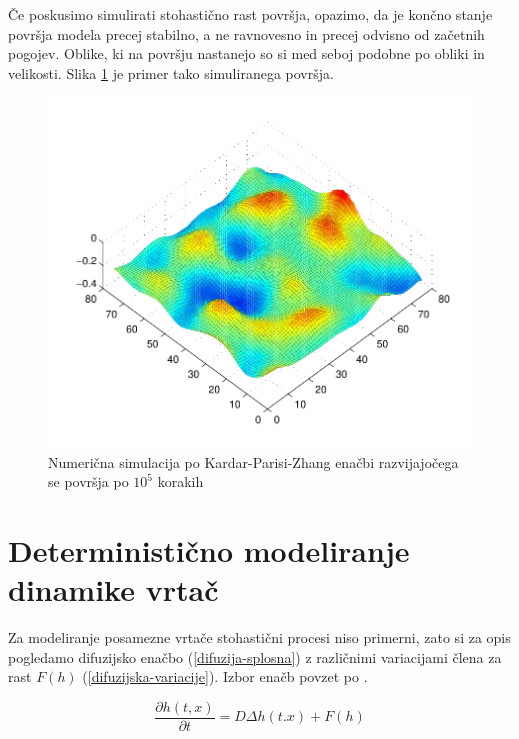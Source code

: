 \documentclass[a4paper, oneside, 12pt]{book}
\begin{document}
            Če poskusimo simulirati stohastično rast površja, opazimo, da je končno stanje površja modela precej stabilno, a ne ravnovesno in precej odvisno od začetnih pogojev. Oblike, ki na površju nastanejo so si med seboj podobne po obliki in velikosti. Slika \ref{fig:KPZ-numericno} je primer tako simuliranega površja.

            \begin{figure}[H]
              \begin{center}
                \includegraphics{slike/KPZ-numericno}
              \end{center}
              \caption{Numerična simulacija po Kardar-Parisi-Zhang enačbi razvijajočega se površja po $10^5$ korakih}
              \label{fig:KPZ-numericno}
            \end{figure}


            \section{Deterministično modeliranje dinamike vrtač}

            Za modeliranje posamezne vrtače stohastični procesi niso primerni, zato si za opis pogledamo difuzijsko enačbo (\ref{difuzija-splosna}) z različnimi variacijami člena za rast $F(h)$ (\ref{difuzijska-variacije}). Izbor enačb povzet po \cite{kandler2010population}.

            \begin{equation}
              \frac{ \partial h(t,x) }{ \partial t} = D \Delta h(t.x) + F(h)
              \label{difuzija-splosna}
            \end{equation}
\end{document}
